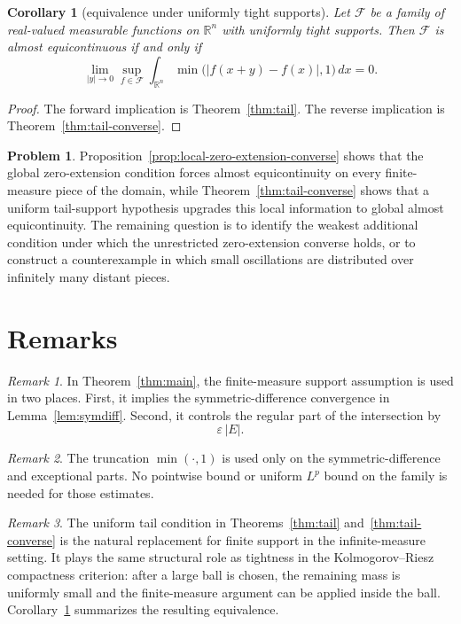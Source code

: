 \documentclass[11pt]{article}
\theoremstyle{plain}
\newtheorem{corollary}{Corollary}
\theoremstyle{definition}
\newtheorem{problem}{Problem}
\theoremstyle{remark}
\newtheorem{remark}{Remark}
\newcommand{\R}{\mathbb{R}}
\newcommand{\F}{\mathcal{F}}
\newcommand{\eps}{\varepsilon}
\newcommand{\meas}[1]{\lvert #1\rvert}
\begin{document}
\begin{corollary}[equivalence under uniformly tight supports]
\label{cor:tail-equivalence}
Let $\F$ be a family of real-valued measurable functions on $\R^n$ with
uniformly tight supports. Then $\F$ is almost equicontinuous if and only if
\[
    \lim_{|y|\to0}\sup_{f\in\F}
    \int_{\R^n}\min\bigl(|f(x+y)-f(x)|,1\bigr)\,dx=0.
\]
\end{corollary}

\begin{proof}
The forward implication is Theorem~\ref{thm:tail}. The reverse implication is
Theorem~\ref{thm:tail-converse}.
\end{proof}

\begin{problem}\label{prob:converse}
Proposition~\ref{prop:local-zero-extension-converse} shows that the global
zero-extension condition forces almost equicontinuity on every finite-measure
piece of the domain, while Theorem~\ref{thm:tail-converse} shows that a
uniform tail-support hypothesis upgrades this local information to global
almost equicontinuity. The remaining question is to identify the weakest
additional condition under which the unrestricted zero-extension converse
holds, or to construct a counterexample in which small oscillations are
distributed over infinitely many distant pieces.
\end{problem}

\section{Remarks}

\begin{remark}
In Theorem~\ref{thm:main}, the finite-measure support assumption is used in
two places. First, it implies the symmetric-difference convergence in
Lemma~\ref{lem:symdiff}. Second, it controls the regular part of the
intersection by
\[
    \eps\,\meas{E}.
\]
\end{remark}

\begin{remark}
The truncation $\min(\cdot,1)$ is used only on the symmetric-difference and
exceptional parts. No pointwise bound or uniform $L^p$ bound on the family is
needed for those estimates.
\end{remark}

\begin{remark}
The uniform tail condition in Theorems~\ref{thm:tail}
and~\ref{thm:tail-converse} is the natural replacement for finite support in
the infinite-measure setting. It plays the same structural role as tightness
in the Kolmogorov--Riesz compactness criterion: after a large ball is chosen,
the remaining mass is uniformly small and the finite-measure argument can be
applied inside the ball. Corollary~\ref{cor:tail-equivalence} summarizes the
resulting equivalence.
\end{remark}
\end{document}
